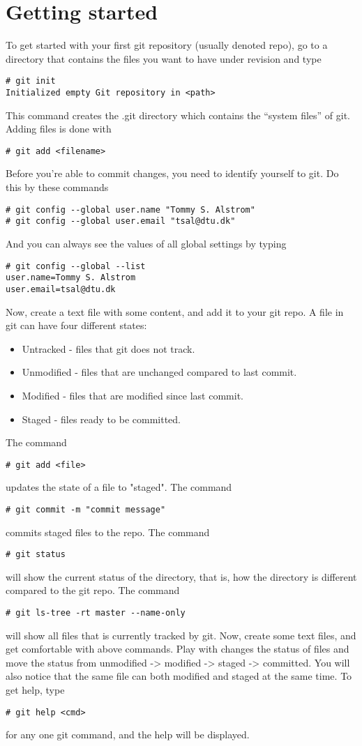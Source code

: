 \documentclass[10pt,a4paper]{article}
\begin{document}
\section{Getting started}
To get started with your first git repository (usually denoted repo), go to a directory that contains the files you want to have under revision and type
\begin{lstlisting}
# git init
Initialized empty Git repository in <path>
\end{lstlisting}
This command creates the .git directory which contains the ``system files'' of git.
Adding files is done with
\begin{lstlisting}
# git add <filename>
\end{lstlisting}
Before you're able to commit changes, you need to identify yourself to git. Do this by these commands
\begin{lstlisting}
# git config --global user.name "Tommy S. Alstrom"
# git config --global user.email "tsal@dtu.dk"
\end{lstlisting}
And you can always see the values of all global settings by typing
\begin{lstlisting}
# git config --global --list 
user.name=Tommy S. Alstrom
user.email=tsal@dtu.dk
\end{lstlisting}
Now, create a text file with some content, and add it to your git repo. A file in git can have four different states:
\begin{itemize}
\item Untracked - files that git does not track.
\item Unmodified - files that are unchanged compared to last commit.
\item Modified - files that are modified since last commit.
\item Staged - files ready to be committed.
\end{itemize}
The command
\begin{lstlisting}
# git add <file>
\end{lstlisting}
updates the state of a file to "staged". The command 
\begin{lstlisting}
# git commit -m "commit message"
\end{lstlisting}
commits staged files to the repo. The command 
\begin{lstlisting}
# git status
\end{lstlisting}
will show the current status of the directory, that is, how the directory is different compared to the git repo. The command 
\begin{lstlisting}
# git ls-tree -rt master --name-only
\end{lstlisting}
will show all files that is currently tracked by git. Now, create some text files, and get comfortable with above commands. Play with changes the status of files and move the status from unmodified -> modified -> staged -> committed. You will also notice that the same file can both modified and staged at the same time. To get help, type \begin{lstlisting}
# git help <cmd>
\end{lstlisting}
for any one git command, and the help will be displayed.
\end{document}

